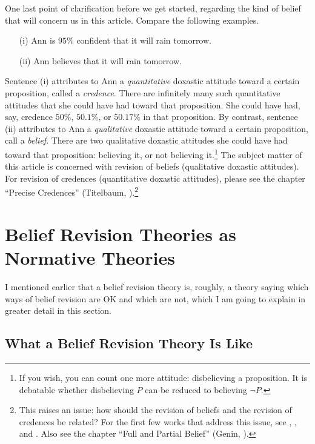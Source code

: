 One last point of clarification before we get started, regarding the kind of belief that will concern us in this article. Compare the following examples.
\begin{itemize}
	\item[(i)]  Ann is $95\%$ confident that it will rain tomorrow.
	\item[(ii)] Ann believes that it will rain tomorrow.
\end{itemize}
Sentence (i) attributes to Ann a {\em quantitative} doxastic attitude toward a certain proposition, called a {\em credence}. There are infinitely many such quantitative attitudes that she could have had toward that proposition. She could have had, say, credence $50\%$, $50.1\%$, or $50.17\%$ in that proposition. By contrast, sentence (ii) attributes to Ann a {\em qualitative} doxastic attitude toward a certain proposition, call a {\em belief}. There are two qualitative doxastic attitudes she could have had toward that proposition: believing it, or not believing it.\footnote
	{If you wish, you can count one more attitude: disbelieving a proposition. It is debatable whether disbelieving $P$ can be reduced to believing $\neg P$.} 
The subject matter of this article is concerned with revision of beliefs (qualitative doxastic attitudes). For revision of credences (quantitative doxastic attitudes), please see the chapter ``Precise Credences'' (Titelbaum, ).\footnote
	{This raises an issue: how should the revision of beliefs and the revision of credences be related? For the first few works that address this issue, see \citet*{arlo2012belief}, \citet*{lin2012propositional}, and \citet{leitgeb2014stability}. Also see the chapter ``Full and Partial Belief'' (Genin, ).} 


\section{Belief Revision Theories as Normative Theories}\label{lin-normative}

I mentioned earlier that a belief revision theory is, roughly, a theory saying which ways of belief revision are OK and which are not, which I am going to explain in greater detail in this section. 

\subsection{What a Belief Revision Theory Is Like}\label{sec-composers}

